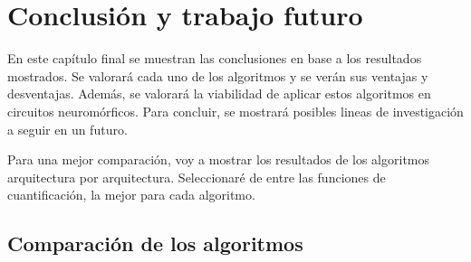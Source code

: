 \chapter{Conclusión y trabajo futuro} \label{conclusion}

En este capítulo final se muestran las conclusiones en base a los resultados mostrados. Se valorará cada uno de los algoritmos y se verán sus ventajas y desventajas. Además, se valorará la viabilidad de aplicar estos algoritmos en circuitos neuromórficos. Para concluir, se mostrará posibles lineas de investigación a seguir en un futuro. 

Para una mejor comparación, voy a mostrar los resultados de los algoritmos arquitectura por arquitectura. Seleccionaré de entre las funciones de cuantificación, la mejor para cada algoritmo.

\section{Comparación de los algoritmos}


